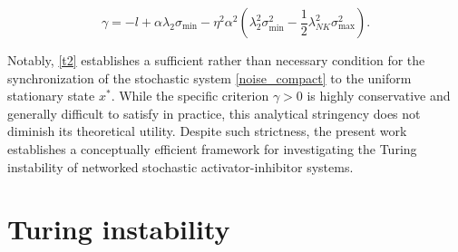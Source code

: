 \documentclass{SCIS2026}
\begin{document}
\begin{equation}\label{gamma}
	\gamma = -l + \alpha \lambda_2 \sigma_{\min} - \eta^2 \alpha^2 \left(\lambda_2^2 \sigma_{\min}^2 - \frac12 \lambda_{NK}^2 \sigma_{\max}^2\right).
\end{equation}

Notably, \cref{t2} establishes a sufficient rather than necessary condition for the synchronization of the stochastic system \eqref{noise_compact} to the uniform stationary state $x^\ast$.
While the specific criterion $\gamma > 0$ is highly conservative and generally difficult to satisfy in practice, this analytical stringency does not diminish its theoretical utility.
Despite such strictness, the present work establishes a conceptually efficient framework for investigating the Turing instability of networked stochastic activator-inhibitor systems.


\section{Turing instability}\label{simulation}
\end{document}
